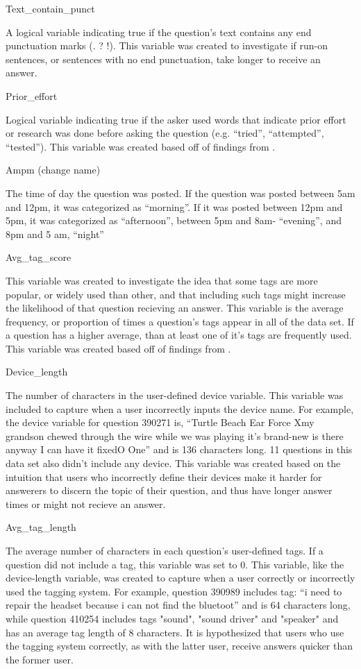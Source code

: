 \documentclass[12pt]{article}
\begin{document}
  
Text\_contain\_punct

A logical variable indicating true if the question’s text contains any end punctuation marks (. ? !). This variable was created to investigate if run-on sentences, or sentences with no end punctuation, take longer to receive an answer. 

Prior\_effort 

Logical variable indicating true if the asker used words that indicate prior effort or research was done before asking the question (e.g. ``tried'', ``attempted'', ``tested''). This variable was created based off of findings from \cite{Bhat2014}. 

Ampm (change name)

The time of day the question was posted. If the question was posted between 5am and 12pm, it was categorized as ``morning''. If it was posted between 12pm and 5pm, it was categorized as ``afternoon'', between 5pm and 8am- ``evening'', and 8pm and 5 am, ``night''

Avg\_tag\_score

This variable was created to investigate the idea that some tags are more popular, or widely used than other, and that including such tags might increase the likelihood of that question recieving an answer. This variable is the average frequency, or proportion of times a question's tags appear in all of the data set. If a question has a higher average, than at least one of it's tags are frequently used. This variable was created based off of findings from \cite{Bhat2014}. 


Device\_length

The number of characters in the user-defined device variable. This variable was included to capture when a user incorrectly inputs the device name. For example, the device variable for question 390271 is, “Turtle Beach Ear Force Xmy grandson chewed through the wire while we was playing it's brand-new is there anyway I can have it fixedO One” and is 136 characters long. 11 questions in this data set also didn’t include any device. This variable was created based on the intuition that users who incorrectly define their devices make it harder for answerers to discern the topic of their question, and thus have longer answer times or might not recieve an answer.

Avg\_tag\_length

The average number of characters in each question's user-defined tags. If a question did not include a tag, this variable was set to 0. This variable, like the device-length variable, was created to capture when a user correctly or incorrectly used the tagging system. For example, question 390989 includes tag: “i need to repair the headset because i can not find the bluetoot” and is 64 characters long, while question 410254 includes tags "sound", "sound driver" and "speaker" and has an average tag length of 8 characters. It is hypothesized that users who use the tagging system correctly, as with the latter user, receive answers quicker than the former user. 
\end{document}
